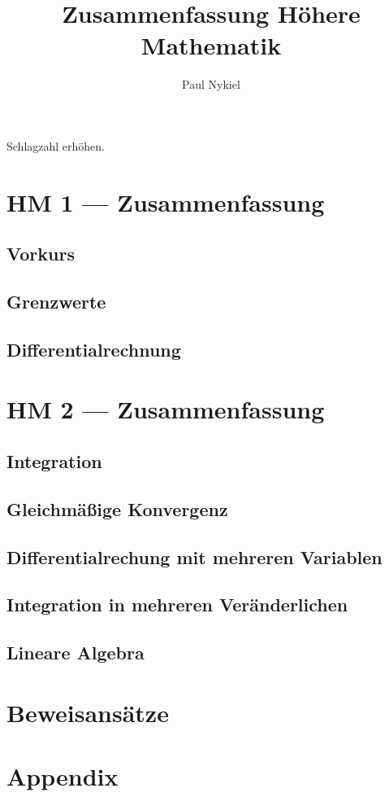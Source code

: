 \documentclass[10pt]{report}
\title{Zusammenfassung Höhere Mathematik}
\author{Paul Nykiel}
\begin{document}
    \maketitle
    \pagebreak
    Schlagzahl erhöhen.
    \pagebreak
    \tableofcontents
    \pagebreak

    \part{HM 1 --- Zusammenfassung}
    \chapter{Vorkurs}
    

    \chapter{Grenzwerte}
    

    \chapter{Differentialrechnung}
    

    \part{HM 2 --- Zusammenfassung}
    \chapter{Integration}
    

    \chapter{Gleichmäßige Konvergenz}
    

    \chapter{Differentialrechung mit mehreren Variablen}
    

    \chapter{Integration in mehreren Veränderlichen}
    

    \chapter{Lineare Algebra}
    

    \part{Beweisansätze}
    

    \part{Appendix}
    
\end{document}
